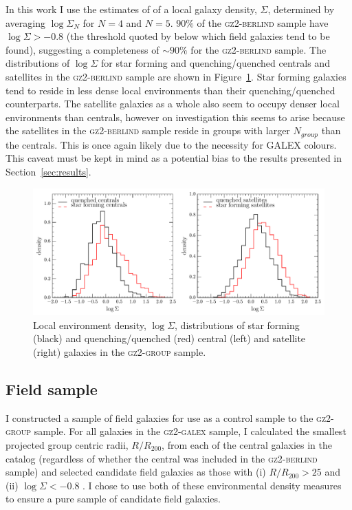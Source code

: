 In this work I use the estimates of \cite{Bamford09} of a local galaxy density, $\Sigma$, determined by averaging $\log\Sigma_N$ for $N = 4$ and $N=5$. $90\%$ of the \textsc{gz2-berlind} sample have $\log\Sigma > -0.8$ (the threshold quoted by \citealt{Baldry06} below which field galaxies tend to be found), suggesting a completeness of $\sim90\%$ for the \textsc{gz2-berlind} sample. The distributions of $\log\Sigma$ for star forming and quenching/quenched centrals and satellites in the \textsc{gz2-berlind} sample are shown in Figure~\ref{fig:sigmadist}. Star forming galaxies tend to reside in less dense local environments than their quenching/quenched counterparts. The satellite galaxies as a whole also seem to occupy denser local environments than centrals, however on investigation this seems to arise because the satellites in the \textsc{gz2-berlind} sample reside in groups with larger $N_{group}$ than the centrals. This is once again likely due to the necessity for GALEX colours. This caveat must be kept in mind as a potential bias to the results presented in Section~\ref{sec:results}. 

\begin{figure}
\centering
\includegraphics[width=\textwidth]{environment/SIGMA_density_sf_q_cent_sat.pdf}
\caption[Local environment density distributions of central and satellite galaxies]{Local environment density, $\log\Sigma$, distributions of star forming (black) and quenching/quenched (red) central (left) and satellite (right) galaxies in the \textsc{gz2-group} sample.}
\label{fig:sigmadist}
\end{figure}


\subsection{Field sample}\label{sec:field}

I constructed a sample of field galaxies for use as a control sample to the \textsc{gz2-group} sample. For all galaxies in the \textsc{gz2-galex} sample, I calculated the smallest projected group centric radii, $R/R_{200}$, from each of the central galaxies in the \citet{berlind06} catalog (regardless of whether the central was included in the \textsc{gz2-berlind} sample) and selected candidate field galaxies as those with (i) $R/R_{200} > 25$ and (ii) $\log\Sigma < -0.8$ \citep[the threshold on the local environment density which selects field galaxies as defined by][]{Baldry06}. I chose to use both of these environmental density measures to ensure a pure sample of candidate field galaxies.

